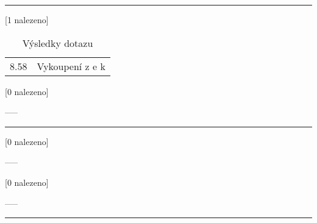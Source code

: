\begin{table}[ht!]
\begin{tt}

\mbox{}\vspace{1em}
\hrule
\mbox{}

\noindent
\begin{minipage}[t]{.5\textwidth}\vspace{0pt}
 [1 nalezeno]\vspace{5pt}

\begin{tabulary}{1.1\textwidth}{LL}
8.58 & Vykoupení z e k \\
\end{tabulary}
\end{minipage}
\begin{minipage}[t]{.5\textwidth}\vspace{0pt}
 [0 nalezeno]\vspace{5pt}

-----
\end{minipage}

\mbox{}\vspace{5pt}
\hrule
\mbox{}

\noindent
\begin{minipage}[t]{.5\textwidth}\vspace{0pt}
 [0 nalezeno]\vspace{5pt}

-----
\end{minipage}
\begin{minipage}[t]{.5\textwidth}\vspace{0pt}
 [0 nalezeno]\vspace{5pt}

-----
\end{minipage}

\mbox{}\vspace{5pt}
\hrule
\mbox{}
\end{tt}

\caption{Výsledky dotazu }
\label{tab:result:vezeni_showsank}
\end{table}
